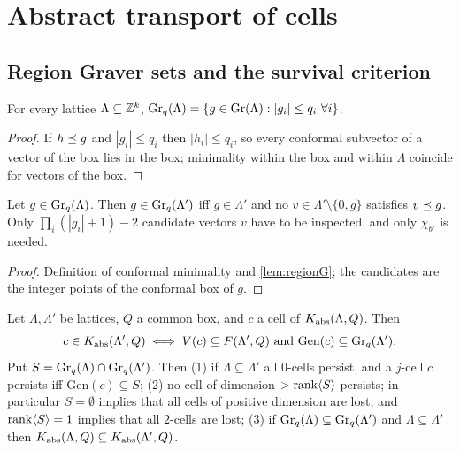 \section{Abstract transport of cells}\label{sec:cells}

\subsection{Region Graver sets and the survival criterion}
\begin{lemma}\label{lem:regionG}
For every lattice $\Lambda\subseteq\mathbb Z^k$, $\Gr_q(\Lambda)=\{g\in\Gr(\Lambda):|g_i|\le q_i\ \forall i\}$.
\end{lemma}
\begin{proof}
If $h\preceq g$ and $|g_i|\le q_i$ then $|h_i|\le q_i$, so every conformal subvector of a vector of the box lies in the box; minimality within the box and within $\Lambda$ coincide for vectors of the box. \qedhere
\end{proof}
\begin{theorem}\label{thm:P2T2}
Let $g\in\operatorname{Gr}_q(\Lambda)$. Then $g\in\operatorname{Gr}_q(\Lambda')$ iff $g\in\Lambda'$ and no $v\in\Lambda'\setminus\{0,g\}$ satisfies $v\preceq g$. Only $\prod_i(|g_i|+1)-2$ candidate vectors $v$ have to be inspected, and only $\chi_{b'}$ is needed.
\end{theorem}
\begin{proof}
Definition of conformal minimality and \cref{lem:regionG}; the candidates are the integer points of the conformal box of $g$. \qedhere
\end{proof}
\begin{theorem}\label{thm:cell-transport}
Let $\Lambda,\Lambda'$ be lattices, $Q$ a common box, and $c$ a cell of $K_{\mathrm{abs}}(\Lambda,Q)$. Then
\[
c\in\Kabs(\Lambda',Q)\iff V(c)\subseteq F(\Lambda',Q)\ \text{and}\ \mathrm{Gen}(c)\subseteq\Gr_q(\Lambda').
\]
Put $S=\operatorname{Gr}_q(\Lambda)\cap\operatorname{Gr}_q(\Lambda')$. Then (1) if $\Lambda\subseteq\Lambda'$ all $0$-cells persist, and a $j$-cell $c$ persists iff $\mathrm{Gen}(c)\subseteq S$; (2) no cell of dimension $>\operatorname{rank}\langle S\rangle$ persists; in particular $S=\emptyset$ implies that all cells of positive dimension are lost, and $\operatorname{rank}\langle S\rangle=1$ implies that all $2$-cells are lost; (3) if $\operatorname{Gr}_q(\Lambda)\subseteq\operatorname{Gr}_q(\Lambda')$ and $\Lambda\subseteq\Lambda'$ then $K_{\mathrm{abs}}(\Lambda,Q)\subseteq K_{\mathrm{abs}}(\Lambda',Q)$.
\end{theorem}
